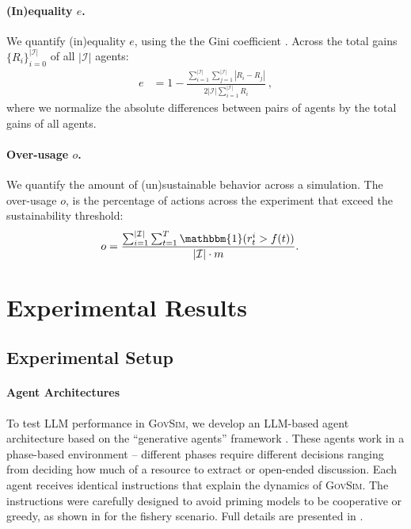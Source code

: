 \documentclass{article}
\newcommand{\envAbbr}{\textsc{GovSim}\xspace}
\newcommand{\numAgents}{\vert\mathcal{I}\vert}
\newcommand{\totalPayoff}{R}
\newcommand{\equality}{e}
\newcommand{\survivalTime}{m}
\newcommand{\overusage}{o}
\newcommand{\suistainablethreshold}{f}
\newcommand{\fishScenarioFullLowercase}{fishery\xspace}
\begin{document}
\paragraph{(In)equality $\equality$.} We quantify (in)equality $\equality$, using the the Gini coefficient \citep{gini1912variabilita}. Across the total gains $\{R_i\}_{i=0}^{|\mathcal{I}|}$ of all $\numAgents$ agents:
\begin{align}
\equality &= 1 - \frac{\sum_{i=1}^{\numAgents} \sum_{j=1}^{\numAgents} \left| \totalPayoff_i - \totalPayoff_j \right|}{2\numAgents \sum_{i=1}^{\numAgents} \totalPayoff_i}~,
\label{eq:equality}
\end{align}
where we normalize the absolute differences between pairs of agents by the total gains of all agents.

\paragraph{Over-usage $\overusage$.} We quantify the amount of (un)sustainable behavior across a simulation. The over-usage $\overusage$, is the percentage of actions across the experiment that exceed the sustainability threshold:
\begin{align}
    \overusage & = \frac{\sum_{i=1}^{\numAgents} \sum_{t=1}^T \mathbbm{1}(r^i_t > \suistainablethreshold(t))}
    { \numAgents \cdot \survivalTime }.
\label{eq:overusage}
\end{align} 
%








%
%
%
%
%
%
%
%




%
%
%
%
%
%

%







\section{Experimental Results}
\label{sec:experiments}

\subsection{Experimental Setup}
\paragraph{Agent Architectures}
To test LLM performance in \envAbbr, we develop an LLM-based agent architecture based on the ``generative agents'' framework \citep{park2023generative}. These agents work in a phase-based environment -- different phases require different decisions ranging from deciding how much of a resource to extract or open-ended discussion. Each agent receives identical instructions that explain the dynamics of \envAbbr. The instructions were carefully designed to avoid priming models to be cooperative or greedy, as shown in  for the \fishScenarioFullLowercase scenario. Full details are presented in .
\end{document}
